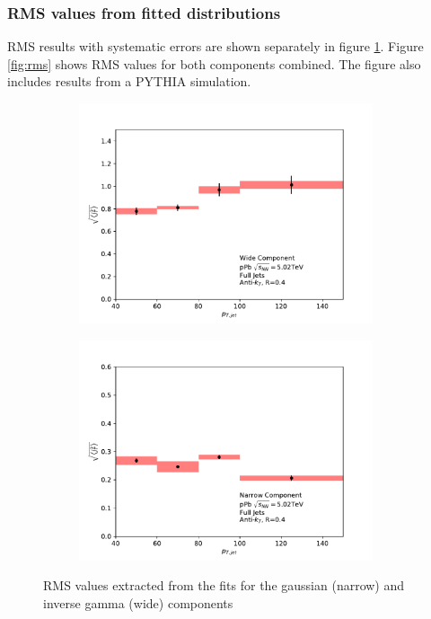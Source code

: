 \subsubsection{RMS values from fitted distributions}
RMS results with systematic errors are shown separately in figure \ref{fig:rmsyield}. Figure \ref{fig:rms} shows RMS values for both components combined. The figure also includes results from a PYTHIA simulation. 
\begin{figure}[htb]
\begin{subfigure}{0.5\textwidth}
\includegraphics[width=0.95\textwidth]{results/gammaRMSWithSystematics}
\end{subfigure}
\begin{subfigure}{0.5\textwidth}
\includegraphics[width=0.95\textwidth]{results/gausRMSWithSystematics}
\end{subfigure}
\caption{RMS values extracted from the fits for the gaussian (narrow) and inverse gamma (wide) components}
\label{fig:rmsyield}
\end{figure}

